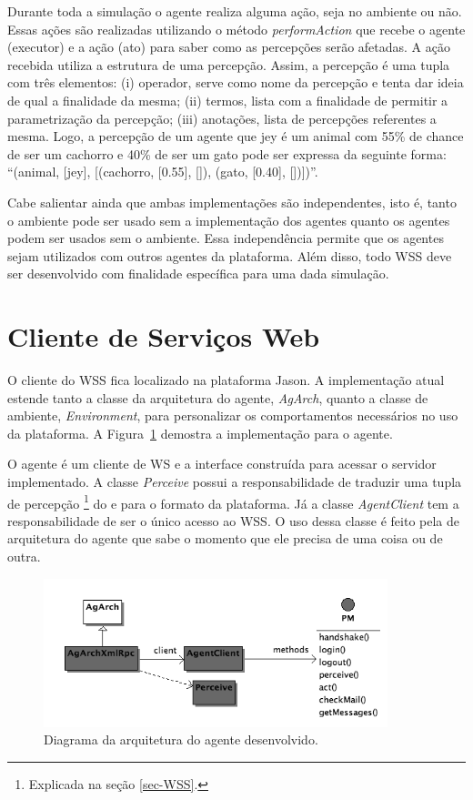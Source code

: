 Durante toda a simulação o agente realiza alguma ação, seja no ambiente ou
não. Essas ações são realizadas utilizando o método \emph{performAction} que
recebe o agente (executor) e a ação (ato) para saber como as percepções serão
afetadas. A ação recebida utiliza a estrutura de uma percepção. Assim, a
percepção é uma tupla com três elementos: (i) operador, serve como nome da
percepção e tenta dar ideia de qual a finalidade da mesma; (ii) termos, lista
com a finalidade de permitir a parametrização da percepção; (iii) anotações,
lista de percepções referentes a mesma. Logo, a percepção de um agente que
jey é um animal com 55\% de chance de ser um cachorro e 40\% de ser um gato
pode ser expressa da seguinte forma:
``(animal, [jey], [(cachorro, [0.55], []), (gato, [0.40], [])])''.

Cabe salientar ainda que ambas implementações são independentes, isto é, tanto
o ambiente pode ser usado sem a implementação dos agentes quanto os agentes
podem ser usados sem o ambiente. Essa independência permite que os
agentes sejam utilizados com outros agentes da plataforma. Além disso, todo
WSS deve ser desenvolvido com finalidade específica para uma dada simulação.


\section{Cliente de Serviços Web} \label{sec-WSC}

O cliente do WSS fica localizado na plataforma Jason. A
implementação atual estende tanto a classe da arquitetura do agente,
\emph{AgArch}, quanto a classe de ambiente, \emph{Environment}, para
personalizar os comportamentos necessários no uso da plataforma. A
Figura~\ref{fig-uml-ag} demostra a implementação para o agente.

O agente é um cliente de WS e a interface construída para
acessar o servidor implementado. A classe \emph{Perceive} possui a
responsabilidade de traduzir uma tupla de percepção \footnote{Explicada na
seção \ref{sec-WSS}.} do e para o formato da plataforma. Já a classe
\emph{AgentClient} tem a responsabilidade de ser o único acesso ao WSS.
O uso dessa classe é feito pela de arquitetura do agente que sabe o momento
que ele precisa de uma coisa ou de outra.

\begin{figure}[h]
               \begin{center}
               \includegraphics[width=100mm]{figuras/implXR-ag.png}
                \end{center}
                \caption{Diagrama da arquitetura do agente desenvolvido.}
                \label{fig-uml-ag}
\end{figure}

